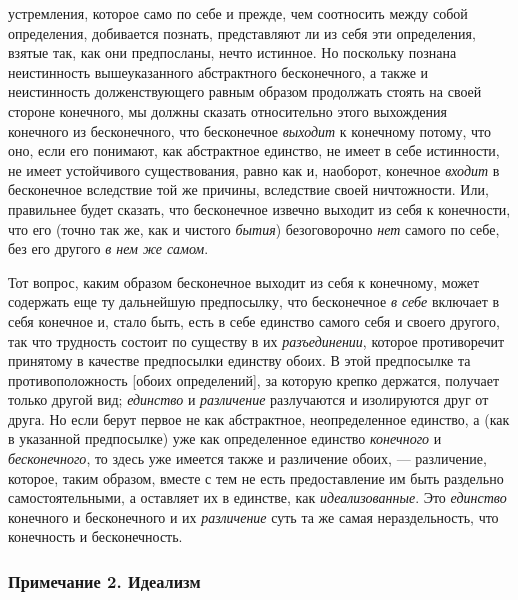 устремления, которое само по себе и прежде, чем соотносить между собой
определения, добивается познать, представляют ли из себя эти определения,
взятые так, как они предпосланы, нечто истинное. Но поскольку познана
неистинность вышеуказанного абстрактного бесконечного, а также и
неистинность долженствующего равным образом продолжать стоять на своей
стороне конечного, мы должны сказать относительно этого выхождения
конечного из бесконечного, что бесконечное
{\em выходит} к конечному потому, что оно, если его
понимают, как абстрактное единство, не имеет в себе истинности, не имеет
устойчивого существования, равно как и, наоборот, конечное
{\em входит} в бесконечное вследствие той же причины,
вследствие своей ничтожности. Или, правильнее будет сказать, что
бесконечное извечно выходит из себя к конечности, что его (точно так же,
как и чистого {\em бытия}) безоговорочно
{\em нет} самого по себе, без его другого
{\em в нем же самом}.

Тот вопрос, каким образом бесконечное выходит из себя к конечному, может
содержать еще ту дальнейшую предпосылку, что бесконечное
{\em в себе} включает в себя конечное и, стало быть,
есть в себе единство самого себя и своего другого, так что трудность
состоит по существу в их {\em разъединении}, которое
противоречит принятому в качестве предпосылки единству обоих. В этой
предпосылке та противоположность [обоих определений], за которую крепко
держатся, получает только другой вид; {\em единство} и
{\em различение} разлучаются и изолируются друг от
друга. Но если берут первое не как абстрактное, неопределенное единство, а
(как в указанной предпосылке) уже как определенное единство
{\em конечного} и
{\em бесконечного}, то здесь уже имеется также и
различение обоих, — различение, которое, таким образом, вместе с тем не
есть предоставление им быть раздельно самостоятельными, а оставляет их в
единстве, как {\em идеализованные}. Это
{\em единство} конечного и бесконечного и их
{\em различение} суть та же самая нераздельность, что
конечность и бесконечность.

\subsubsection[Примечание 2. Идеализм]{Примечание 2. Идеализм}

